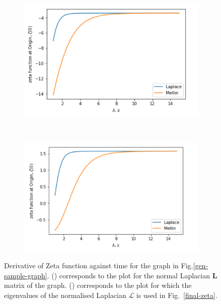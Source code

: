 \documentclass[10pt,a4paper]{article}
\theoremstyle{plain}
\theoremstyle{definition}
\begin{document}
    \begin{figure}[H]
    	\centering
    	\begin{subfigure}[b]{0.5\textwidth}
    		\includegraphics[width= \textwidth]{images/Zeta-function-Origin-normal.png}
    		\caption{}
    		\label{normal-zetaderivative}
    	\end{subfigure}~
    	\begin{subfigure}[b]{0.5\textwidth}
    		\includegraphics[width= \textwidth]{images/Zeta-function-Origin.png}
    		\caption{ }
    		\label{normalised-zetaderivative}
    	\end{subfigure}
    	\caption{Derivative of Zeta function against time for the graph in Fig.\ref{gen-sample-graph}. () corresponds to the plot for the normal Laplacian $\mathbf{L}$ matrix of the graph. () corresponds to the plot for which the eigenvalues of the normalised Laplacian $\mathcal{L}$ is used in Fig.~\ref{final-zeta}.}
    	\label{}
    \end{figure}
    
\end{document}
